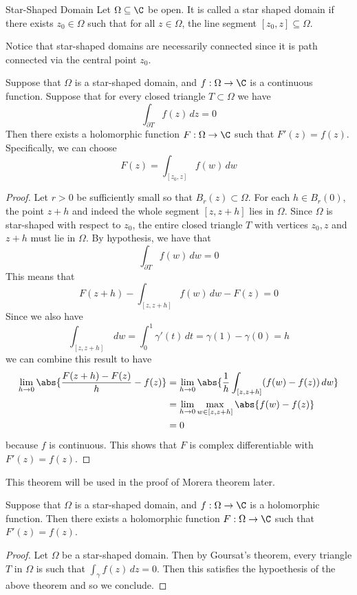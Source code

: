 \documentclass[a4paper]{article}
\begin{document}
\begin{defn}{Star-Shaped Domain}{} Let $\Omega\subseteq\C$ be open. It is called a star shaped domain if there exists $z_0\in\Omega$ such that for all $z\in\Omega$, the line segment $[z_0,z]\subseteq\Omega$. 
\end{defn}

Notice that star-shaped domains are necessarily connected since it is path connected via the central point $z_0$. 

\begin{thm}{}{} Suppose that $\Omega$ is a star-shaped domain, and $f:\Omega\to\C$ is a continuous function. Suppose that for every closed triangle $T\subset\Omega$ we have $$\int_{\partial T}f(z)\,dz=0$$ Then there exists a holomorphic function $F:\Omega\to\C$ such that $F'(z)=f(z)$. Specifically, we can choose $$F(z)=\int_{[z_0,z]}f(w)\,dw$$ \tcbline
\begin{proof}
Let $r>0$ be sufficiently small so that $B_r(z)\subset\Omega$. For each $h\in B_r(0)$, the point $z+h$ and indeed the whole segment $[z,z+h]$ lies in $\Omega$. Since $\Omega$ is star-shaped with respect to $z_0$, the entire closed triangle $T$ with vertices $z_0,z$ and $z+h$ must lie in $\Omega$. By hypothesis, we have that $$\int_{\partial T}f(w)\,dw=0$$ This means that $$F(z+h)-\int_{[z,z+h]}f(w)\,dw-F(z)=0$$ Since we also have $$\int_{[z,z+h]}\,dw=\int_0^1\gamma'(t)\,dt=\gamma(1)-\gamma(0)=h$$ we can combine this result to have 
\begin{align*}
\lim_{h\to 0}\abs{\frac{F(z+h)-F(z)}{h}-f(z)}&=\lim_{h\to 0}\abs{\frac{1}{h}\int_{[z,z+h]}(f(w)-f(z))\,dw}\\
&=\lim_{h\to 0}\max_{w\in[z,z+h]}\abs{f(w)-f(z)}\\
&=0
\end{align*}
because $f$ is continuous. This shows that $F$ is complex differentiable with $F'(z)=f(z)$. 
\end{proof}
\end{thm}

This theorem will be used in the proof of Morera theorem later. 

\begin{crl}{}{} Suppose that $\Omega$ is a star-shaped domain, and $f:\Omega\to\C$ is a holomorphic function. Then there exists a holomorphic function $F:\Omega\to\C$ such that $F'(z)=f(z)$. \tcbline
\begin{proof}
Let $\Omega$ be a star-shaped domain. Then by Goursat's theorem, every triangle $T$ in $\Omega$ is such that $\int_\gamma f(z)\,dz=0$. Then this satisfies the hypoethesis of the above theorem and so we conclude. 
\end{proof}
\end{crl}
\end{document}
